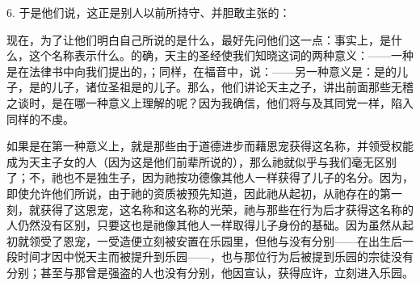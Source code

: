 6. 于是他们说，这正是别人以前所持守、并胆敢主张的：\par

现在，为了让他们明白自己所说的是什么，最好先问他们这一点：事实上，是什么，这个名称表示什么。的确，天主的圣经使我们知晓这词的两种意义：——一种是在法律书中向我们提出的，；同样，在福音中，说：——另一种意义是：是的儿子，是的儿子，诸位圣祖是的儿子。那么，他们讲论天主之子，讲出前面那些无稽之谈时，是在哪一种意义上理解的呢？因为我确信，他们将与及其同党一样，陷入同样的不虔。\par

如果是在第一种意义上，就是那些由于道德进步而藉恩宠获得这名称，并领受权能成为天主子女的人（因为这是他们前辈所说的），那么祂就似乎与我们毫无区别了；不，祂也不是独生子，因为祂按功德像其他人一样获得了儿子的名分。因为，即使允许他们所说，由于祂的资质被预先知道，因此祂从起初，从祂存在的第一刻，就获得了这恩宠，这名称和这名称的光荣，祂与那些在行为后才获得这名称的人仍然没有区别，只要这也是祂像其他人一样取得儿子身份的基础。因为虽然从起初就领受了恩宠，一受造便立刻被安置在乐园里，但他与没有分别——在出生后一段时间才因中悦天主而被提升到乐园——，也与那位行为后被提到乐园的宗徒没有分别；甚至与那曾是强盗的人也没有分别，他因宣认，获得应许，立刻进入乐园。\par

